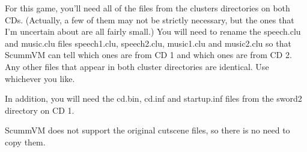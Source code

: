 For this game, you'll need all of the files from the clusters directories on
both CDs. (Actually, a few of them may not be strictly necessary, but the ones
that I'm uncertain about are all fairly small.) You will need to rename the
speech.clu and music.clu files speech1.clu, speech2.clu, music1.clu and
music2.clu so that ScummVM can tell which ones are from CD 1 and which ones are
from CD 2. Any other files that appear in both cluster directories are
identical. Use whichever you like.

In addition, you will need the cd.bin, cd.inf and startup.inf files from the
sword2 directory on CD 1.

ScummVM does not support the original cutscene files, so there is no need to
copy them.
